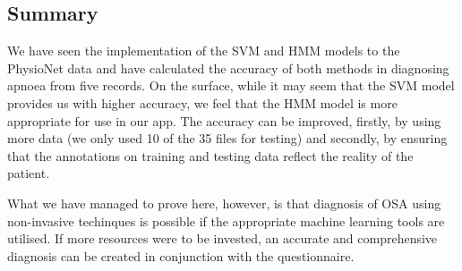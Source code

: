 \subsection{Summary}

We have seen the implementation of the SVM and HMM models to the PhysioNet data and have calculated the accuracy of both methods in diagnosing apnoea from five records. On the surface, while it may seem that the SVM model provides us with higher accuracy, we feel that the HMM model is more appropriate for use in our app. The accuracy can be improved, firstly, by using more data (we only used 10 of the 35 files for testing) and secondly, by ensuring that the annotations on training and testing data reflect the reality of the patient.

What we have managed to prove here, however, is that diagnosis of OSA using non-invasive techinques is possible if the appropriate machine learning tools are utilised. If more resources were to be invested, an accurate and comprehensive diagnosis can be created in conjunction with the questionnaire.